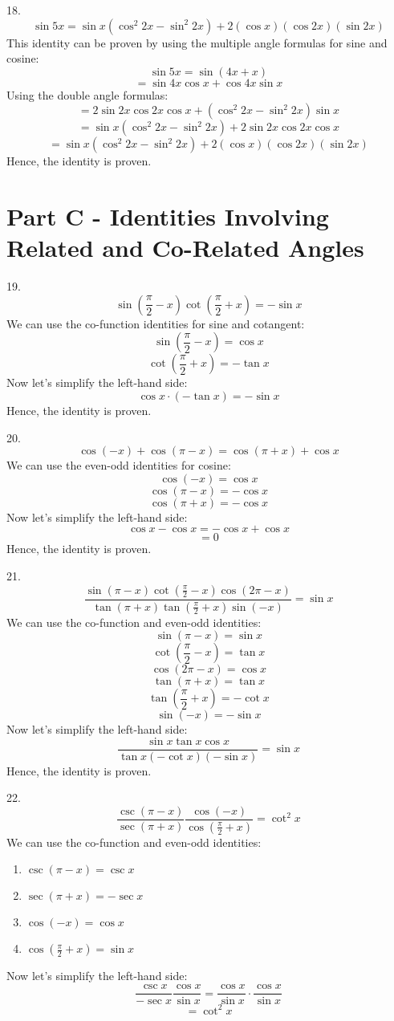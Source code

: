 \documentclass{article}
\begin{document}
\vspace{2em}
18. $$\sin 5x = \sin x(\cos^2 2x - \sin^2 2x) + 2(\cos x)(\cos 2x)(\sin 2x)$$
    This identity can be proven by using the multiple angle formulas for sine and cosine:
    \[\sin 5x = \sin (4x + x)\]
    \[= \sin 4x \cos x + \cos 4x \sin x\]
    Using the double angle formulas:
    \[= 2\sin 2x \cos 2x \cos x + (\cos^2 2x - \sin^2 2x) \sin x\]
    \[= \sin x(\cos^2 2x - \sin^2 2x) + 2\sin 2x \cos 2x \cos x\]
    \[= \sin x(\cos^2 2x - \sin^2 2x) + 2(\cos x)(\cos 2x)(\sin 2x)\]
    Hence, the identity is proven.

\vspace{2em}
\section*{Part C - Identities Involving Related and Co-Related Angles}

19. $$\sin \left(\frac{\pi}{2} - x\right) \cot \left(\frac{\pi}{2} + x\right) = -\sin x$$
    We can use the co-function identities for sine and cotangent:
    \[\sin \left(\frac{\pi}{2} - x\right) = \cos x\]
    \[\cot \left(\frac{\pi}{2} + x\right) = -\tan x\]
    Now let's simplify the left-hand side:
    \[\cos x \cdot (-\tan x) = -\sin x\]
    Hence, the identity is proven.
    
\vspace{2em}
20. $$\cos (-x) + \cos (\pi - x) = \cos (\pi + x) + \cos x$$
    We can use the even-odd identities for cosine:
    \[\cos (-x) = \cos x\]
    \[\cos (\pi - x) = -\cos x\]
    \[\cos (\pi + x) = -\cos x\]
    Now let's simplify the left-hand side:
    \[\cos x - \cos x = -\cos x + \cos x\]
    \[= 0\]
    Hence, the identity is proven.
    
\vspace{2em}
21. $$\frac{\sin (\pi - x) \cot \left(\frac{\pi}{2} - x\right) \cos (2\pi - x)}{\tan (\pi + x) \tan \left(\frac{\pi}{2} + x\right) \sin (-x)} = \sin x$$
    We can use the co-function and even-odd identities:
    \[\sin (\pi - x) = \sin x\]
    \[\cot \left(\frac{\pi}{2} - x\right) = \tan x\]
    \[\cos (2\pi - x) = \cos x\]
    \[\tan (\pi + x) = \tan x\]
    \[\tan \left(\frac{\pi}{2} + x\right) = -\cot x\]
    \[\sin (-x) = -\sin x\]
    Now let's simplify the left-hand side:
    \[\frac{\sin x \tan x \cos x}{\tan x (-\cot x) (-\sin x)} = \sin x\]
    Hence, the identity is proven.

\vspace{2em}
22. $$\frac{\csc (\pi - x)}{\sec (\pi + x)} \frac{\cos (-x)}{\cos \left(\frac{\pi}{2} + x\right)} = \cot^2 x$$
    We can use the co-function and even-odd identities:
    \begin{enumerate}
        \item  \(\csc (\pi - x) = \csc x\)
        \item \(\sec (\pi + x) = -\sec x\)
        \item \(\cos (-x) = \cos x\)
        \item \(\cos \left(\frac{\pi}{2} + x\right) = \sin x\)
    \end{enumerate}
    Now let's simplify the left-hand side:
    \[\frac{\csc x}{-\sec x} \frac{\cos x}{\sin x} = \frac{\cos x}{\sin x} \cdot \frac{\cos x}{\sin x}\]
    \[= \cot^2 x\]
\end{document}
